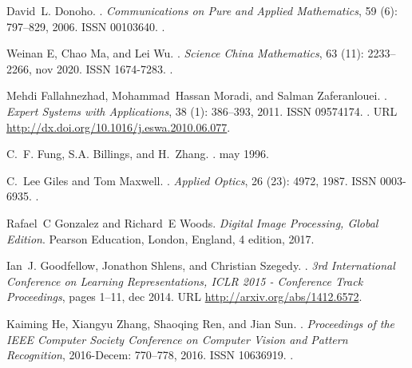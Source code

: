 \documentclass[twoside,11pt]{article}
\begin{document}
\begin{thebibliography}{36}
David~L. Donoho.
.
\newblock \emph{Communications on Pure and Applied Mathematics}, 59
  (6): 797--829, 2006.
\newblock ISSN 00103640.
\newblock {}.

Weinan E, Chao Ma, and Lei Wu.
.
\newblock \emph{Science China Mathematics}, 63 (11):
  2233--2266, nov 2020.
\newblock ISSN 1674-7283.
\newblock {}.

Mehdi Fallahnezhad, Mohammad~Hassan Moradi, and Salman Zaferanlouei.
.
\newblock \emph{Expert Systems with Applications}, 38 (1):
  386--393, 2011.
\newblock ISSN 09574174.
\newblock {}.
\newblock URL \url{http://dx.doi.org/10.1016/j.eswa.2010.06.077}.

C.~F. Fung, S.A. Billings, and H.~Zhang.
.
\newblock may 1996.

C.~Lee Giles and Tom Maxwell.
.
\newblock \emph{Applied Optics}, 26 (23): 4972, 1987.
\newblock ISSN 0003-6935.
\newblock {}.

Rafael~C Gonzalez and Richard~E Woods.
\newblock \emph{{Digital Image Processing, Global Edition}}.
\newblock Pearson Education, London, England, 4 edition, 2017.

Ian~J. Goodfellow, Jonathon Shlens, and Christian Szegedy.
.
\newblock \emph{3rd International Conference on Learning Representations, ICLR
  2015 - Conference Track Proceedings}, pages 1--11, dec 2014.
\newblock URL \url{http://arxiv.org/abs/1412.6572}.

Kaiming He, Xiangyu Zhang, Shaoqing Ren, and Jian Sun.
.
\newblock \emph{Proceedings of the IEEE Computer Society Conference on Computer
  Vision and Pattern Recognition}, 2016-Decem: 770--778, 2016.
\newblock ISSN 10636919.
\newblock {}.


\end{thebibliography}
\end{document}

